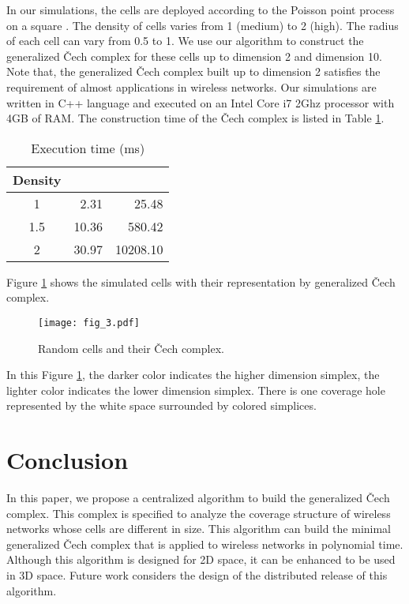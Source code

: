 \documentclass[conference]{IEEEtran}
\begin{document}
In our simulations, the cells are deployed according to the Poisson point process on a square . The density of cells varies from 1 (medium) to 2 (high). The radius of each cell can vary from 0.5 to 1. We use our algorithm to construct the generalized \v{C}ech complex for these cells up to dimension 2 and dimension 10. Note that, the generalized \v{C}ech complex built up to dimension 2 satisfies the requirement of almost applications in wireless networks. Our simulations are written in C++ language and executed on an Intel Core i7 2Ghz processor with 4GB of RAM.
The construction time of the \v{C}ech complex is listed in Table \ref{table:time}.
\begin{table}[H]\caption{Execution time (ms)}
\label{table:time}
\begin{center}
\begin{tabular}{|c|r|r|}
\hline
Density &	&\\
\hline
		1	&2.31	&25.48\\
		1.5	&10.36	&580.42	\\
		2	&30.97	&10208.10 \\
\hline
\end{tabular}
\end{center}
\end{table}
Figure \ref{fig:representation} shows the simulated cells with their representation by generalized \v{C}ech complex. 
\begin{figure}[H]
\centering
\texttt{[image: fig\_3.pdf]}
\hfill
\caption{Random cells and their \v{C}ech complex.}
\label{fig:representation}
\end{figure}
In this Figure \ref{fig:representation}, the darker color indicates the higher dimension simplex, the lighter color indicates the lower dimension simplex. There is one coverage hole represented by the white space surrounded by colored simplices.


\section{Conclusion}
In this paper, we propose a centralized algorithm to build the generalized \v{C}ech complex. This complex is specified to analyze the coverage structure of wireless networks whose cells are different in size. This algorithm can build the minimal generalized \v{C}ech complex that is applied to wireless networks in polynomial time. Although this algorithm is designed for 2D space, it can be enhanced to be used in 3D space. Future work considers the design of the distributed release of this algorithm.











\end{document}
